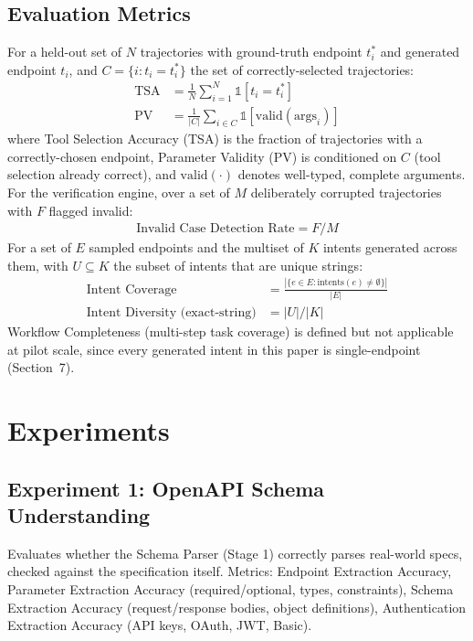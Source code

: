 \documentclass[letterpaper]{article} %
\begin{document}
\subsection{Evaluation Metrics}
For a held-out set of $N$ trajectories with ground-truth endpoint $t_i^*$ and generated endpoint
$t_i$, and $C = \{i : t_i = t_i^*\}$ the set of correctly-selected trajectories:
\begin{align*}
\text{TSA} &= \frac{1}{N}\sum_{i=1}^{N} \mathbb{1}[t_i = t_i^*] \\
\text{PV} &= \frac{1}{|C|}\sum_{i \in C} \mathbb{1}[\mathrm{valid}(\mathrm{args}_i)]
\end{align*}
where Tool Selection Accuracy (TSA) is the fraction of trajectories with a correctly-chosen
endpoint, Parameter Validity (PV) is conditioned on $C$ (tool selection already correct), and
$\mathrm{valid}(\cdot)$ denotes well-typed, complete arguments. For the verification engine, over
a set of $M$ deliberately corrupted trajectories with $F$ flagged invalid:
\begin{align*}
\text{Invalid Case Detection Rate} = F / M
\end{align*}
For a set of $E$ sampled endpoints and the multiset of $K$ intents generated across them, with
$U \subseteq K$ the subset of intents that are unique strings:
\begin{align*}
\text{Intent Coverage} &= \frac{|\{e \in E : \text{intents}(e) \neq \emptyset\}|}{|E|} \\
\text{Intent Diversity (exact-string)} &= |U| / |K|
\end{align*}
Workflow Completeness (multi-step task coverage) is defined but not applicable at pilot scale,
since every generated intent in this paper is single-endpoint (Section~7).

\section{Experiments}

\subsection{Experiment 1: OpenAPI Schema Understanding}
Evaluates whether the Schema Parser (Stage 1) correctly parses real-world specs, checked against
the specification itself. Metrics: Endpoint Extraction Accuracy, Parameter Extraction Accuracy
(required/optional, types, constraints), Schema Extraction Accuracy (request/response bodies,
object definitions), Authentication Extraction Accuracy (API keys, OAuth, JWT, Basic).
\end{document}
